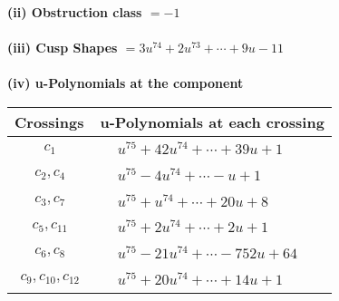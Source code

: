 \documentclass[1p]{elsarticle_modified}
\theoremstyle{definition}
\begin{document}
\flushleft \textbf{(ii) Obstruction class $= -1$}\\~\\
\flushleft \textbf{(iii) Cusp Shapes $= 3 u^{74}+2 u^{73}+\cdots+9 u-11$}\\~\\
\newpage\renewcommand{\arraystretch}{1}
\flushleft \textbf{(iv) u-Polynomials at the component}\newline \\
\begin{tabular}{m{50pt}|m{274pt}}
Crossings & \hspace{64pt}u-Polynomials at each crossing \\
\hline $$\begin{aligned}c_{1}\end{aligned}$$&$\begin{aligned}
&u^{75}+42 u^{74}+\cdots+39 u+1
\end{aligned}$\\
\hline $$\begin{aligned}c_{2},c_{4}\end{aligned}$$&$\begin{aligned}
&u^{75}-4 u^{74}+\cdots- u+1
\end{aligned}$\\
\hline $$\begin{aligned}c_{3},c_{7}\end{aligned}$$&$\begin{aligned}
&u^{75}+u^{74}+\cdots+20 u+8
\end{aligned}$\\
\hline $$\begin{aligned}c_{5},c_{11}\end{aligned}$$&$\begin{aligned}
&u^{75}+2 u^{74}+\cdots+2 u+1
\end{aligned}$\\
\hline $$\begin{aligned}c_{6},c_{8}\end{aligned}$$&$\begin{aligned}
&u^{75}-21 u^{74}+\cdots-752 u+64
\end{aligned}$\\
\hline $$\begin{aligned}c_{9},c_{10},c_{12}\end{aligned}$$&$\begin{aligned}
&u^{75}+20 u^{74}+\cdots+14 u+1
\end{aligned}$\\
\hline
\end{tabular}\\~\\
\end{document}
